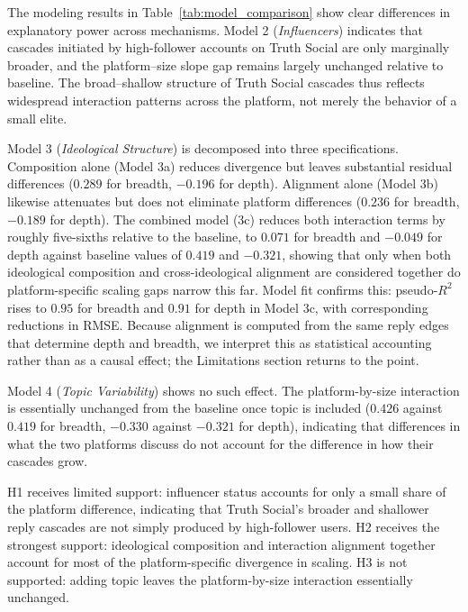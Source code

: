 \documentclass[letterpaper]{article} %
\newcommand{\rev}[1]{{\color{blue}#1}}
\begin{document}
The modeling results in Table~\ref{tab:model_comparison} show clear differences in explanatory power across mechanisms. Model 2 (\textit{Influencers}) indicates that cascades initiated by high-follower accounts on Truth Social are only marginally broader, and the platform--size slope gap remains largely unchanged relative to baseline. The broad--shallow structure of Truth Social cascades thus reflects widespread interaction patterns across the platform, not merely the behavior of a small elite.

Model 3 (\textit{Ideological Structure}) is decomposed into three specifications. Composition alone (Model 3a) reduces divergence but leaves substantial residual differences \rev{($0.289$ for breadth, $-0.196$ for depth)}. Alignment alone (Model 3b) likewise attenuates but does not eliminate platform differences \rev{($0.236$ for breadth, $-0.189$ for depth)}. The combined model (3c) \rev{reduces both interaction terms by roughly five-sixths relative to the baseline, to $0.071$ for breadth and $-0.049$ for depth against baseline values of $0.419$ and $-0.321$}, showing that only when both ideological composition and cross-ideological alignment are considered together do platform-specific scaling gaps narrow this far. Model fit confirms this: pseudo-$R^2$ rises to \rev{$0.95$ for breadth and $0.91$ for depth} in Model 3c, with corresponding reductions in RMSE. \rev{Because alignment is computed from the same reply edges that determine depth and breadth, we interpret this as statistical accounting rather than as a causal effect; the Limitations section returns to the point.}

Model 4 (\textit{Topic Variability}) shows \rev{no such effect. The platform-by-size interaction is essentially unchanged from the baseline once topic is included ($0.426$ against $0.419$ for breadth, $-0.330$ against $-0.321$ for depth), indicating that differences in what the two platforms discuss do not account for the difference in how their cascades grow.}

H1 receives limited support: influencer status accounts for only a small share of the platform difference, indicating that Truth Social's broader and shallower reply cascades are not simply produced by high-follower users. H2 receives the strongest support: ideological \rev{composition and interaction alignment together account for most of the platform-specific divergence in scaling.} \rev{H3 is not supported: adding topic leaves the platform-by-size interaction essentially unchanged.}
\end{document}
